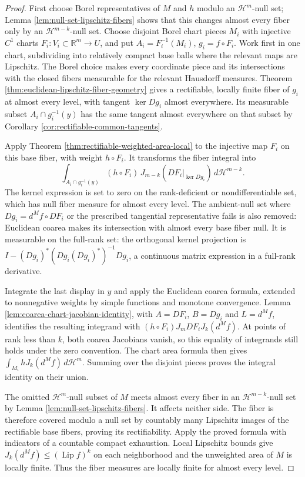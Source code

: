 \begin{proof}
First choose Borel representatives of $M$ and $h$ modulo an $\mathcal H^m$-null set; Lemma \ref{lem:null-set-lipschitz-fibers} shows that this changes almost every fiber only by an $\mathcal H^{m-k}$-null set. Choose disjoint Borel chart pieces $M_i$ with injective $C^1$ charts $F_i:V_i\subset\mathbb R^m\to U$, and put $A_i=F_i^{-1}(M_i)$, $g_i=f\circ F_i$. Work first in one chart, subdividing into relatively compact base balls where the relevant maps are Lipschitz. The Borel choice makes every coordinate piece and its intersections with the closed fibers measurable for the relevant Hausdorff measures. Theorem \ref{thm:euclidean-lipschitz-fiber-geometry} gives a rectifiable, locally finite fiber of $g_i$ at almost every level, with tangent $\ker Dg_i$ almost everywhere. Its measurable subset $A_i\cap g_i^{-1}(y)$ has the same tangent almost everywhere on that subset by Corollary \ref{cor:rectifiable-common-tangents}.

Apply Theorem \ref{thm:rectifiable-weighted-area-local} to the injective map $F_i$ on this base fiber, with weight $h\circ F_i$. It transforms the fiber integral into
\[
 \int_{A_i\cap g_i^{-1}(y)}
 (h\circ F_i)\,J_{m-k}(DF_i|_{\ker Dg_i})\,d\mathcal H^{m-k}.
\]
The kernel expression is set to zero on the rank-deficient or nondifferentiable set, which has null fiber measure for almost every level. The ambient-null set where $Dg_i=d^Mf\circ DF_i$ or the prescribed tangential representative fails is also removed: Euclidean coarea makes its intersection with almost every base fiber null. It is measurable on the full-rank set: the orthogonal kernel projection is $I-(Dg_i)^*(Dg_i(Dg_i)^*)^{-1}Dg_i$, a continuous matrix expression in a full-rank derivative.

Integrate the last display in $y$ and apply the Euclidean coarea formula, extended to nonnegative weights by simple functions and monotone convergence. Lemma \ref{lem:coarea-chart-jacobian-identity}, with $A=DF_i$, $B=Dg_i$ and $L=d^Mf$, identifies the resulting integrand with $(h\circ F_i)J_mDF_iJ_k(d^Mf)$. At points of rank less than $k$, both coarea Jacobians vanish, so this equality of integrands still holds under the zero convention. The chart area formula then gives $\int_{M_i}hJ_k(d^Mf)\,d\mathcal H^m$. Summing over the disjoint pieces proves the integral identity on their union.

The omitted $\mathcal H^m$-null subset of $M$ meets almost every fiber in an $\mathcal H^{m-k}$-null set by Lemma \ref{lem:null-set-lipschitz-fibers}. It affects neither side. The fiber is therefore covered modulo a null set by countably many Lipschitz images of the rectifiable base fibers, proving its rectifiability. Apply the proved formula with indicators of a countable compact exhaustion. Local Lipschitz bounds give $J_k(d^Mf)\leq(\operatorname{Lip}f)^k$ on each neighborhood and the unweighted area of $M$ is locally finite. Thus the fiber measures are locally finite for almost every level.


\end{proof}
